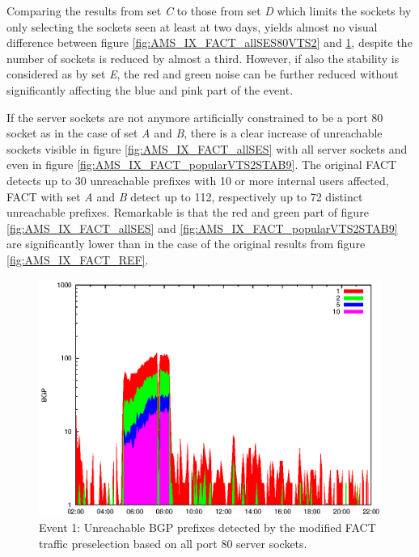 Comparing the results from set \emph{C} to those from set \emph{D} which limits 
the sockets by only selecting the sockets seen at least at two days, yields 
almost no visual difference between figure \ref{fig:AMS_IX_FACT_allSES80VTS2} 
and \ref{fig:AMS_IX_FACT_allSES80}, despite the number of sockets is reduced by 
almost a third. However, if also the stability is considered as by set \emph{E}, 
the red and green noise can be further reduced without significantly affecting 
the blue and pink part of the event.

If the server sockets are not anymore artificially constrained to be a port 80 
socket as in the case of set \emph{A} and \emph{B}, there is a clear increase of 
unreachable sockets visible in figure \ref{fig:AMS_IX_FACT_allSES} with all 
server sockets and even in figure \ref{fig:AMS_IX_FACT_popularVTS2STAB9}. The 
original FACT detects up to 30 unreachable prefixes with 10 or more internal 
users affected, FACT with set \emph{A} and \emph{B} detect up to 112, 
respectively up to 72 distinct unreachable prefixes. Remarkable is that the red 
and green part of figure \ref{fig:AMS_IX_FACT_allSES} and 
\ref{fig:AMS_IX_FACT_popularVTS2STAB9} are significantly lower than in the case 
of the original results from figure \ref{fig:AMS_IX_FACT_REF}.

\begin{figure}
	[p] \centering 
	\includegraphics[width=0.75\linewidth]{images/events/2010_03_25/bgp_log_allPort80SES.eps}
	\caption{Event 1: Unreachable BGP prefixes detected by the modified FACT traffic preselection based on all port 80 server sockets.} 
	\label{fig:AMS_IX_FACT_allSES80} 
\end{figure}


